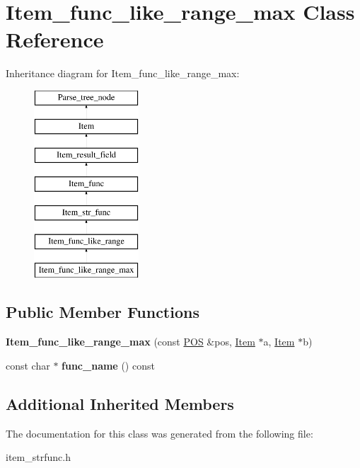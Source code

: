 \hypertarget{classItem__func__like__range__max}{}\section{Item\+\_\+func\+\_\+like\+\_\+range\+\_\+max Class Reference}
\label{classItem__func__like__range__max}
Inheritance diagram for Item\+\_\+func\+\_\+like\+\_\+range\+\_\+max\+:\begin{figure}[H]
\begin{center}
\leavevmode
\includegraphics[height=7.000000cm]{classItem__func__like__range__max}
\end{center}
\end{figure}
\subsection*{Public Member Functions}
\begin{DoxyCompactItemize}
\item 
\mbox{\label{classItem__func__like__range__max_aff2d3c26423263bc4df83959620da1d5}} 
{\bfseries Item\+\_\+func\+\_\+like\+\_\+range\+\_\+max} (const \mbox{\hyperlink{structYYLTYPE}{P\+OS}} \&pos, \mbox{\hyperlink{classItem}{Item}} $\ast$a, \mbox{\hyperlink{classItem}{Item}} $\ast$b)
\item 
\mbox{\label{classItem__func__like__range__max_a947287897ed6bd9d5990c8bf96ffd047}} 
const char $\ast$ {\bfseries func\+\_\+name} () const
\end{DoxyCompactItemize}
\subsection*{Additional Inherited Members}


The documentation for this class was generated from the following file\+:\begin{DoxyCompactItemize}
\item 
item\+\_\+strfunc.\+h\end{DoxyCompactItemize}
